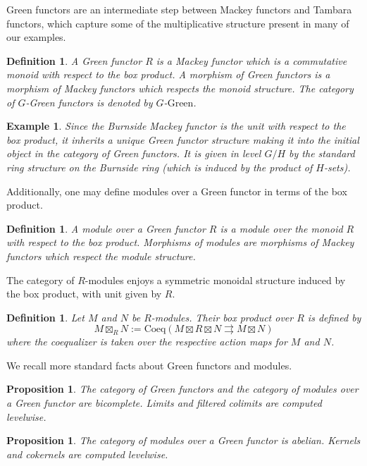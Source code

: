 \documentclass[11pt,dvipsnames]{amsart}
\newtheorem{proposition}[theorem]{Proposition}
\theoremstyle{BoldRemark}
\newtheorem{example}[theorem]{Example}
\newtheorem{definition}[theorem]{Definition}
\newcommand{\Green}{\mathrm{Green}}
\begin{document}
Green functors are an intermediate step between Mackey functors and Tambara functors, which capture some of the multiplicative structure present in many of our examples.

\begin{definition}
	A Green functor $R$ is a Mackey functor which is a commutative monoid with respect to the box product. A morphism of Green functors is a morphism of Mackey functors which respects the monoid structure. The category of $G$-Green functors is denoted by $G$-$\Green$.
\end{definition}

\begin{example}
	Since the Burnside Mackey functor is the unit with respect to the box product, it inherits a unique Green functor structure making it into the initial object in the category of Green functors. It is given in level $G/H$ by the standard ring structure on the Burnside ring (which is induced by the product of $H$-sets).
\end{example}

Additionally, one may define modules over a Green functor in terms of the box product.

\begin{definition}
	A module over a Green functor $R$ is a module over the monoid $R$ with respect to the box product. Morphisms of modules are morphisms of Mackey functors which respect the module structure.
\end{definition}

The category of $R$-modules enjoys a symmetric monoidal structure induced by the box product, with unit given by $R$.

\begin{definition}
	Let $M$ and $N$ be $R$-modules. Their box product over $R$ is defined by \[ M \boxtimes_R N := \mathrm{Coeq}( M \boxtimes R \boxtimes N \rightrightarrows M \boxtimes N ) \] where the coequalizer is taken over the respective action maps for $M$ and $N$.
\end{definition}

We recall more standard facts about Green functors and modules.

\begin{proposition}
	The category of Green functors and the category of modules over a Green functor are bicomplete. Limits and filtered colimits are computed levelwise.
\end{proposition}

\begin{proposition}
	The category of modules over a Green functor is abelian. Kernels and cokernels are computed levelwise.
\end{proposition}
\end{document}
